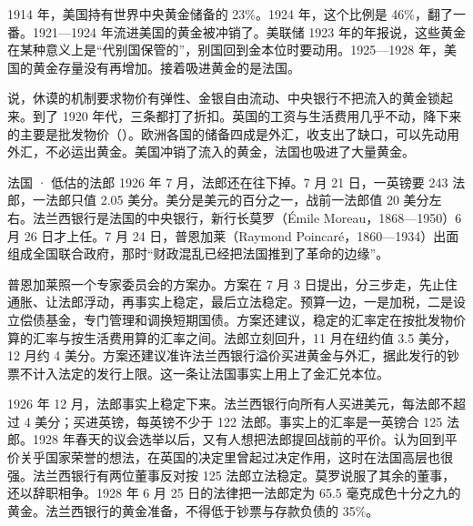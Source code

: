 1914 年，美国持有世界中央黄金储备的 23\%。1924 年，这个比例是 46\%，翻了一番\cite{nurkse1944}。1921—1924 年流进美国的黄金被冲销了\cite{nurkse1944}。美联储 1923 年的年报说，这些黄金在某种意义上是“代别国保管的”，别国回到金本位时要动用\cite{brown1940}。1925—1928 年，美国的黄金存量没有再增加\cite{nurkse1944}。接着吸进黄金的是法国。

说，休谟的机制要求物价有弹性、金银自由流动、中央银行不把流入的黄金锁起来。到了 1920 年代，三条都打了折扣。英国的工资与生活费用几乎不动，降下来的主要是批发物价（）。欧洲各国的储备四成是外汇，收支出了缺口，可以先动用外汇，不必运出黄金。美国冲销了流入的黄金，法国也吸进了大量黄金。

\begin{case}{法国 · 低估的法郎}
1926 年 7 月，法郎还在往下掉。7 月 21 日，一英镑要 243 法郎，一法郎只值 2.05 美分\cite{brown1940}。美分是美元的百分之一，战前一法郎值 20 美分左右\cite{dulles1929}。法兰西银行是法国的中央银行，新行长莫罗（Émile Moreau，1868—1950）6 月 26 日才上任\cite{bnf27,brown1940}。7 月 24 日，普恩加莱（Raymond Poincaré，1860—1934）出面组成全国联合政府，那时“财政混乱已经把法国推到了革命的边缘”\cite{brown1940,poincarelife2026}。

普恩加莱照一个专家委员会的方案办。方案在 7 月 3 日提出，分三步走，先止住通胀、让法郎浮动，再事实上稳定，最后立法稳定\cite{brown1940}。预算一边，一是加税，二是设立偿债基金，专门管理和调换短期国债\cite{brown1940}。方案还建议，稳定的汇率定在按批发物价算的汇率与按生活费用算的汇率之间\cite{brown1940}。法郎立刻回升，11 月在纽约值 3.5 美分，12 月约 4 美分\cite{brown1940}。方案还建议准许法兰西银行溢价买进黄金与外汇，据此发行的钞票不计入法定的发行上限。这一条让法国事实上用上了金汇兑本位\cite{brown1940}。

1926 年 12 月，法郎事实上稳定下来\cite{brown1940}。法兰西银行向所有人买进美元，每法郎不超过 4 美分；买进英镑，每英镑不少于 122 法郎\cite{brown1940}。事实上的汇率是一英镑合 125 法郎\cite{brown1940}。1928 年春天的议会选举以后，又有人想把法郎提回战前的平价。认为回到平价关乎国家荣誉的想法，在英国的决定里曾起过决定作用，这时在法国高层也很强\cite{brown1940}。法兰西银行有两位董事反对按 125 法郎立法稳定。莫罗说服了其余的董事，还以辞职相争\cite{brown1940}。1928 年 6 月 25 日的法律把一法郎定为 65.5 毫克成色十分之九的黄金\cite{brown1940}。法兰西银行的黄金准备，不得低于钞票与存款负债的 35\%\cite{brown1940,dulles1929}。


\end{case}
